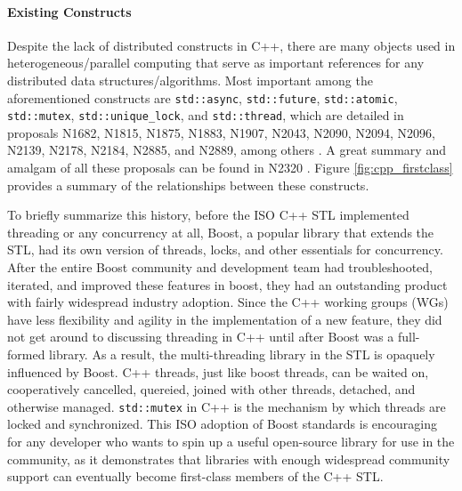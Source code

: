 \paragraph{Existing Constructs}
Despite the lack of distributed constructs in C++, there are many objects used in heterogeneous/parallel computing that serve as important references for any distributed data structures/algorithms. Most important among the aforementioned constructs are \texttt{std::async}, \texttt{std::future}, \texttt{std::atomic}, \texttt{std::mutex}, \texttt{std::unique\_lock}, and \texttt{std::thread}, which are detailed in proposals N1682, N1815, N1875, N1883, N1907, N2043, N2090, N2094,  N2096, N2139, N2178, N2184, N2885, and N2889, among others  \cite{n1682} \cite{n1815} \cite{n1875} \cite{n1883} \cite{n1907} \cite{n2043} \cite{n2096} \cite{n2139} \cite{n2178} \cite{n2184} \cite{n2285} \cite{n2889}. A great summary and amalgam of all these proposals can be found in N2320 \cite{n2320}. Figure \ref{fig:cpp_firstclass} provides a summary of the relationships between these constructs.

To briefly summarize this history, before the ISO C++ STL  implemented threading or any concurrency at all, Boost, a popular library that extends the STL, had its own version of threads, locks, and other essentials for concurrency. After the entire Boost community and development team had troubleshooted, iterated, and improved these features in boost, they had an outstanding product with fairly widespread industry adoption. Since the C++ working groups (WGs) have less flexibility and agility in the implementation of a new feature, they did not get around to discussing threading in C++ until after Boost was a full-formed library. As a result, the multi-threading library in the STL is opaquely influenced by Boost. C++ threads, just like boost threads, can be waited on, cooperatively cancelled, quereied, joined with other threads, detached, and otherwise managed. \texttt{std::mutex} in C++ is the mechanism by which threads are locked and synchronized. This ISO adoption of Boost standards is encouraging for any developer who wants to spin up a useful open-source library for use in the community, as it demonstrates that libraries with enough widespread community support can eventually become first-class members of the C++ STL. 

